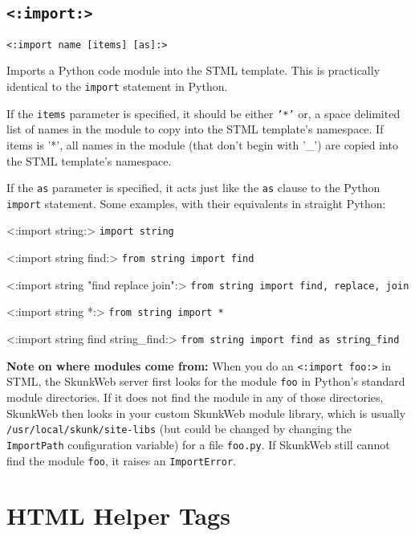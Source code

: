 \documentclass{manual}
\begin{document}
\section{\texttt{<:import:>}}
\label{tagimport}

\begin{verbatim}<:import name [items] [as]:>\end{verbatim}

Imports a Python code module into the STML template. This
is practically identical to the \texttt{import}
statement in Python.

If the \texttt{items} parameter is specified, it should be 
either \texttt{'*'} or, a space delimited list of names 
in the module to copy into the STML template's namespace. 
If items is '*', all names in the module (that don't begin
with '_') are copied into the STML template's namespace.

If the \texttt{as} parameter is specified, it acts just like the
\texttt{as} clause to the Python \texttt{import} statement.
Some examples, with their equivalents in straight Python:

\begin{argdesc}

\item[<:import string:>]
\texttt{import string}
\item[<:import string find:>]   \texttt{from string import find}
\item[<:import string "find replace join":>]   \texttt{from string import find, replace, join}
\item[<:import string *:>]   \texttt{from string import *}
\item[<:import string find string_find:>] \texttt{from string import find as string_find}
\end{argdesc}

\textbf{Note on where modules come from:} When you
do an \texttt{<:import foo:>} in STML, the SkunkWeb server
first looks for the module \texttt{foo} in Python's standard
module directories. If it does not find the module in any
of those directories, SkunkWeb then looks in your custom SkunkWeb
module library, which is usually \texttt{/usr/local/skunk/site-libs}
(but could be changed by changing the \texttt{ImportPath}
configuration variable)
for a file \texttt{foo.py}.
If SkunkWeb still cannot find the module \texttt{foo}, it raises an 
\texttt{ImportError}.



\chapter{HTML Helper Tags}
\label{stmlrefurl}
\end{document}
